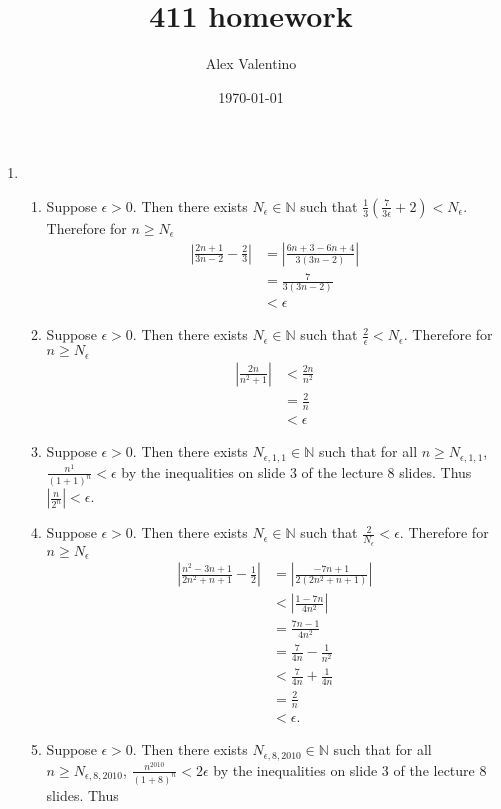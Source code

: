 \documentclass[12pt, letterpaper]{article}
\date{\today}
\author{Alex Valentino}
\title{411 homework}
\newcommand{\N}{\mathbb{N}}
\begin{document}
\begin{enumerate}
	\item 
	\begin{enumerate}
		\item Suppose $\epsilon	> 0$.  Then there exists $N_\epsilon \in \N$ such that $\frac{1}{3}\left(\frac{7}{3\epsilon} + 2\right) < N_\epsilon$.  Therefore for $n \geq N_\epsilon$
		\begin{align*}
		\left| \frac{2n+1}{3n-2} - \frac{2}{3}\right| &= \left| \frac{6n+3 - 6n + 4}{3(3n-2)} \right|\\
		&= \frac{7}{3(3n-2)}\\
		&< \epsilon
		\end{align*}
		\item Suppose $\epsilon	> 0$.  Then there exists $N_\epsilon \in \N$ such that $\frac{2}{\epsilon} < N_\epsilon$.  Therefore for $n \geq N_\epsilon$
		\begin{align*}
			\left| \frac{2n}{n^2+1} \right| &< \frac{2n}{n^2}\\
			&= \frac{2}{n}\\
			&< \epsilon
		\end{align*}
		\item Suppose $\epsilon	> 0$.  Then there exists $N_{\epsilon,1,1} \in \N$ such that  for all $n \geq N_{\epsilon,1,1}$, $\frac{n^1}{(1+1)^n} < \epsilon$ by the inequalities on slide 3 of the lecture 8 slides.  Thus
		$|\frac{n}{2^n}| < \epsilon$.
		\item Suppose $\epsilon	> 0$.  Then there exists $N_\epsilon \in \N$ such that $\frac{2}{N_\epsilon} < \epsilon$.  Therefore for $n \geq N_\epsilon$ 
		\begin{align*}
		\left| \frac{n^2 - 3n + 1}{2n^2 + n + 1} - \frac{1}{2} \right| &= \left| \frac{-7n+1}{2(2n^2 + n + 1)} \right|\\
		&< \left|\frac{1-7n}{4n^2}\right|\\
		&= \frac{7n-1}{4n^2}\\
		&= \frac{7}{4n} - \frac{1}{n^2}\\
		&< \frac{7}{4n} + \frac{1}{4n}\\
		&=\frac{2}{n}\\
		&< \epsilon.
		\end{align*}
		\item Suppose $\epsilon	> 0$.  Then there exists $N_{\epsilon,8,2010} \in \N$ such that  for all $n \geq N_{\epsilon,8,2010}$, $\frac{n^{2010}}{(1+8)^n} < 2\epsilon$ by the inequalities on slide 3 of the lecture 8 slides.  Thus 
		\begin{align*}

\end{align*}
\end{enumerate}
\end{enumerate}
\end{document}
